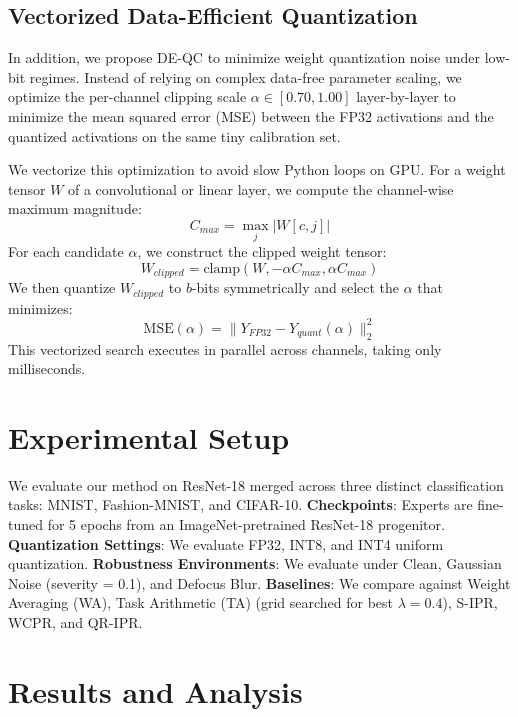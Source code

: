 \documentclass{article}
\theoremstyle{plain}
\theoremstyle{definition}
\theoremstyle{remark}
\begin{document}
\subsection{Vectorized Data-Efficient Quantization}
In addition, we propose DE-QC to minimize weight quantization noise under low-bit regimes. Instead of relying on complex data-free parameter scaling, we optimize the per-channel clipping scale $\alpha \in [0.70, 1.00]$ layer-by-layer to minimize the mean squared error (MSE) between the FP32 activations and the quantized activations on the same tiny calibration set.

We vectorize this optimization to avoid slow Python loops on GPU. For a weight tensor $W$ of a convolutional or linear layer, we compute the channel-wise maximum magnitude:
\begin{equation}
    C_{max} = \max_{j} |W[c, j]|
\end{equation}
For each candidate $\alpha$, we construct the clipped weight tensor:
\begin{equation}
    W_{clipped} = \text{clamp}(W, -\alpha C_{max}, \alpha C_{max})
\end{equation}
We then quantize $W_{clipped}$ to $b$-bits symmetrically and select the $\alpha$ that minimizes:
\begin{equation}
    \text{MSE}(\alpha) = \|Y_{FP32} - Y_{quant}(\alpha)\|^2_2
\end{equation}
This vectorized search executes in parallel across channels, taking only milliseconds.

\section{Experimental Setup}
\label{sec:setup}

We evaluate our method on ResNet-18 merged across three distinct classification tasks: MNIST, Fashion-MNIST, and CIFAR-10.
\textbf{Checkpoints}: Experts are fine-tuned for 5 epochs from an ImageNet-pretrained ResNet-18 progenitor.
\textbf{Quantization Settings}: We evaluate FP32, INT8, and INT4 uniform quantization.
\textbf{Robustness Environments}: We evaluate under Clean, Gaussian Noise (severity = 0.1), and Defocus Blur.
\textbf{Baselines}: We compare against Weight Averaging (WA), Task Arithmetic (TA) (grid searched for best $\lambda=0.4$), S-IPR, WCPR, and QR-IPR.

\section{Results and Analysis}
\label{sec:results}
\end{document}
